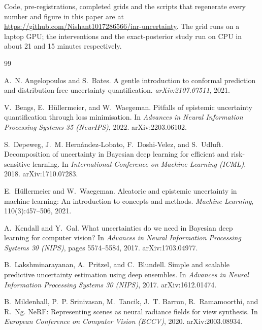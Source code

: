 \documentclass[10pt]{article}
\begin{document}
Code, pre-registrations, completed grids and the scripts that regenerate every number and
figure in this paper are at
\url{https://github.com/Nishant1017286566/inr-uncertainty}. The grid runs on a
laptop GPU; the interventions and the exact-posterior study run on CPU in about 21 and 15
minutes respectively.

\begin{thebibliography}{99}
\small

A.~N. Angelopoulos and S.~Bates.
\newblock A gentle introduction to conformal prediction and distribution-free uncertainty
quantification.
\newblock \emph{arXiv:2107.07511}, 2021.

V.~Bengs, E.~H\"ullermeier, and W.~Waegeman.
\newblock Pitfalls of epistemic uncertainty quantification through loss minimisation.
\newblock In \emph{Advances in Neural Information Processing Systems 35 (NeurIPS)}, 2022.
arXiv:2203.06102.

S.~Depeweg, J.~M. Hern\'andez-Lobato, F.~Doshi-Velez, and S.~Udluft.
\newblock Decomposition of uncertainty in Bayesian deep learning for efficient and risk-sensitive
learning.
\newblock In \emph{International Conference on Machine Learning (ICML)}, 2018.
arXiv:1710.07283.

E.~H\"ullermeier and W.~Waegeman.
\newblock Aleatoric and epistemic uncertainty in machine learning: An introduction to concepts
and methods.
\newblock \emph{Machine Learning}, 110(3):457--506, 2021.

A.~Kendall and Y.~Gal.
\newblock What uncertainties do we need in Bayesian deep learning for computer vision?
\newblock In \emph{Advances in Neural Information Processing Systems 30 (NIPS)}, pages
5574--5584, 2017. arXiv:1703.04977.

B.~Lakshminarayanan, A.~Pritzel, and C.~Blundell.
\newblock Simple and scalable predictive uncertainty estimation using deep ensembles.
\newblock In \emph{Advances in Neural Information Processing Systems 30 (NIPS)}, 2017.
arXiv:1612.01474.

B.~Mildenhall, P.~P. Srinivasan, M.~Tancik, J.~T. Barron, R.~Ramamoorthi, and R.~Ng.
\newblock NeRF: Representing scenes as neural radiance fields for view synthesis.
\newblock In \emph{European Conference on Computer Vision (ECCV)}, 2020. arXiv:2003.08934.


\end{thebibliography}
\end{document}
